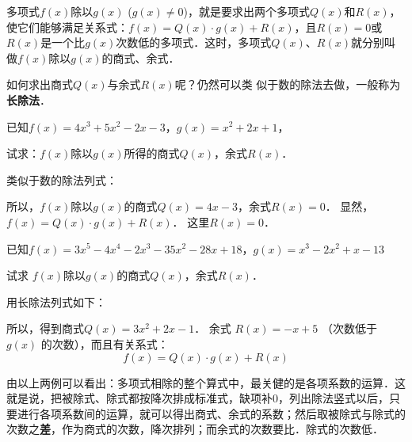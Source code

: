 多项式$f(x)$除以$g(x)$ ($g(x)\ne 0$)，就是要求出两个多项式$Q(x)$和$R(x)$，使它们能够满足关系式：$f(x)=Q(x)\cdot g(x)+R(x)$，且$R(x)=0$或$R(x)$是一个比$g(x)$次数低的多项式．这时，多项式$Q(x)$、$R(x)$就分别叫做$f(x)$除以$g(x)$的商式、余式．

如何求出商式$Q(x)$与余式$R(x)$呢？仍然可以类
似于数的除法去做，一般称为\textbf{长除法}．

\begin{example}
    已知$f(x)=4x^3+5x^2-2x-3$，$g (x) =x^2+2x+1$，
   
    试求：$f(x)$除以$g(x)$所得的商式$Q(x)$，余式$R(x)$．
\end{example}

\begin{solution}
    类似于数的除法列式：
    

    所以，$f(x)$除以$g(x)$的商式$Q(x)=4x-3$，余式$R (x) =0$．
    显然，$f(x)=Q(x)\cdot g(x)+R(x)$．
    这里$R(x)=0$．
\end{solution}

\begin{example}
已知$f(x)=3x^5-4x^4-2x^3-35x^2-28x+18$，$g (x) =x^3-2x^2+x-13$

试求 $f(x)$除以$g(x)$的商式$Q(x)$，余式$R(x)$．
\end{example}

\begin{solution}
    用长除法列式如下：


    所以，得到商式$Q(x)=3x^2+2x-1$．
    余式 $R(x)=-x+5$ （次数低于$g(x)$
    的次数），而且有关系式：
   \[ f (x) =Q (x) \cdot g (x) +R (x) \]

\end{solution}


    由以上两例可以看出：多项式相除的整个算式中，最关健的是各项系数的运算．这就是说，把被除式、除式都按降次排成标准式，缺项补0，列出除法竖式以后，只要进行各项系数间的运算，就可以得出商式、余式的系数；然后取被除式与除式的次数之\textbf{差}，作为商式的次数，降次排列；而余式的次数要比．除式的次数低．
    
